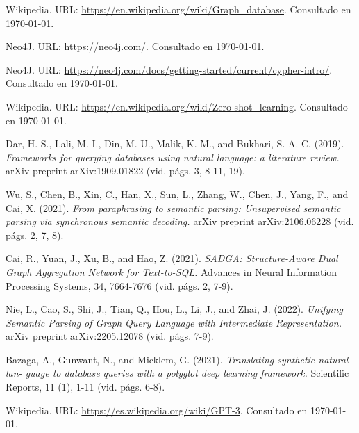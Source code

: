 \documentclass[a4paper,10pt,twocolumn]{article}
\begin{document}
\begin{thebibliography}{99}
	
	 Wikipedia. URL: \href{https://en.wikipedia.org/wiki/Graph_database}
	  {https://en.wikipedia.org/wiki/Graph\_database}.
		Consultado en \today.

	 Neo4J. URL: \href{https://neo4j.com/}
	  {https://neo4j.com/}.
		Consultado en \today.

	 Neo4J. URL: \href{https://neo4j.com/docs/getting-started/current/cypher-intro/}
	  {https://neo4j.com/docs/getting-started/current/cypher-intro/}.
		Consultado en \today.

	 Wikipedia. URL: \href{https://en.wikipedia.org/wiki/Zero-shot_learning}
	  {https://en.wikipedia.org/wiki/Zero-shot\_learning}.
		Consultado en \today.

	 Dar, H. S., Lali, M. I., Din, M. U., Malik, K. M., and Bukhari, S. A. C. (2019). \emph{Frameworks for querying databases using natural language: a literature review.}
		arXiv preprint arXiv:1909.01822 (vid. págs. 3, 8-11, 19).

	 Wu, S., Chen, B., Xin, C., Han, X., Sun, L., Zhang, W., Chen, J., Yang, F., and Cai, X. (2021). \emph{From paraphrasing to semantic parsing: Unsupervised semantic parsing via synchronous semantic decoding.}
		arXiv preprint arXiv:2106.06228 (vid. págs. 2, 7, 8).

	 Cai, R., Yuan, J., Xu, B., and Hao, Z. (2021). \emph{SADGA: Structure-Aware Dual Graph
	Aggregation Network for Text-to-SQL.}
		Advances in Neural Information Processing Systems, 34, 7664-7676 (vid. págs. 2, 7-9).

	 Nie, L., Cao, S., Shi, J., Tian, Q., Hou, L., Li, J., and Zhai, J. (2022). \emph{Unifying Semantic Parsing of Graph Query Language with Intermediate Representation.}
		arXiv preprint arXiv:2205.12078 (vid. págs. 7-9).

	 Bazaga, A., Gunwant, N., and Micklem, G. (2021). \emph{Translating synthetic natural lan-
	guage to database queries with a polyglot deep learning framework.}
		Scientific Reports, 11 (1), 1-11 (vid. págs. 6-8).

	 Wikipedia. URL: \href{https://es.wikipedia.org/wiki/GPT-3}
	  {https://es.wikipedia.org/wiki/GPT-3}.
		Consultado en \today.


\end{thebibliography}
\end{document}
